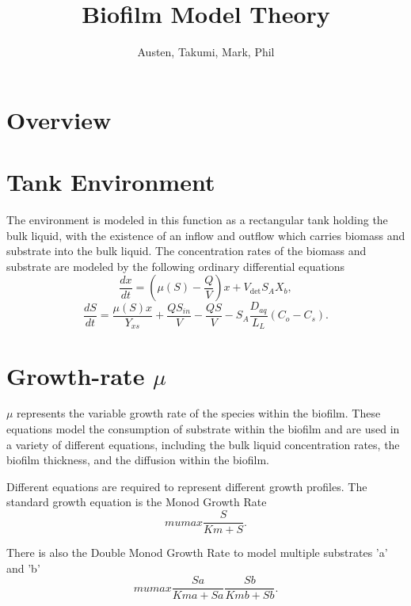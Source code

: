 \documentclass[letterpaper, twoside]{article}
\title{Biofilm Model Theory}
\author{Austen, Takumi, Mark, Phil}
\date{}
\begin{document}
\maketitle
{}

\section{Overview}

\section{Tank Environment}
The environment is modeled in this function as a rectangular tank holding the bulk liquid, with the existence of an inflow and outflow which carries biomass and substrate into the bulk liquid. The concentration rates of the biomass and substrate are modeled by the following ordinary differential equations
\begin{equation} \label{eq: BiomassEquation}
  \frac{dx}{dt} = \left(\mu(S) - \frac{Q}{V}\right) x + V_{\mathrm{det}} S_A X_b,
\end{equation}
\begin{equation} \label{eq: SubstrateEquation}
  \frac{dS}{dt} = \frac{\mu(S) x}{Y_{xs}} + \frac{Q S_{in}}{V} - \frac{Q S}{V} - S_A \frac{D_{aq}}{L_L} (C_o-C_s).
\end{equation}


\section{Growth-rate $\mu$}
$\mu$ represents the variable growth rate of the species within the biofilm. These equations model the consumption of substrate within the biofilm and are used in a variety of different equations, including the bulk liquid concentration rates, the biofilm thickness, and the diffusion within the biofilm.

Different equations are required to represent different growth profiles. The standard growth equation is the Monod Growth Rate
\begin{equation} \label{eq: MonodGrowthRate}
  mumax \frac{S}{Km + S}.
\end{equation}

There is also the Double Monod Growth Rate to model multiple substrates 'a' and 'b'
\begin{equation} \label{eq: DoubleMonodGrowthRate}
  mumax \frac{Sa}{Kma + Sa} \frac{Sb}{Kmb + Sb}.
\end{equation}
\end{document}
